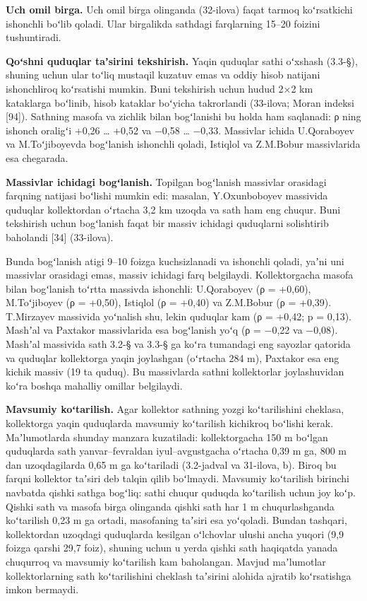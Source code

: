 \documentclass[14pt,a4paper,oneside]{extreport}
\begin{document}
\textbf{Uch omil birga.} Uch omil birga olinganda (32-ilova) faqat
tarmoq koʻrsatkichi ishonchli boʻlib qoladi. Ular birgalikda sathdagi
farqlarning 15--20 foizini tushuntiradi.

\textbf{Qoʻshni quduqlar taʼsirini tekshirish.} Yaqin quduqlar sathi
oʻxshash (3.3-§), shuning uchun ular toʻliq mustaqil kuzatuv emas va
oddiy hisob natijani ishonchliroq koʻrsatishi mumkin. Buni tekshirish
uchun hudud 2×2 km kataklarga boʻlinib, hisob kataklar boʻyicha
takrorlandi (33-ilova; Moran indeksi {[}94{]}). Sathning masofa va
zichlik bilan bogʻlanishi bu holda ham saqlanadi: ρ ning ishonch
oraligʻi +0,26 \ldots{} +0,52 va −0,58 \ldots{} −0,33. Massivlar ichida
U.Qoraboyev va M.Toʻjiboyevda bogʻlanish ishonchli qoladi, Istiqlol va
Z.M.Bobur massivlarida esa chegarada.

\textbf{Massivlar ichidagi bogʻlanish.} Topilgan bogʻlanish massivlar
orasidagi farqning natijasi boʻlishi mumkin edi: masalan, Y.Oxunboboyev
massivida quduqlar kollektordan oʻrtacha 3,2 km uzoqda va sath ham eng
chuqur. Buni tekshirish uchun bogʻlanish faqat bir massiv ichidagi
quduqlarni solishtirib baholandi {[}34{]} (33-ilova).

Bunda bogʻlanish atigi 9--10 foizga kuchsizlanadi va ishonchli qoladi,
yaʼni uni massivlar orasidagi emas, massiv ichidagi farq belgilaydi.
Kollektorgacha masofa bilan bogʻlanish toʻrtta massivda ishonchli:
U.Qoraboyev (ρ = +0,60), M.Toʻjiboyev (ρ = +0,50), Istiqlol (ρ = +0,40)
va Z.M.Bobur (ρ = +0,39). T.Mirzayev massivida yoʻnalish shu, lekin
quduqlar kam (ρ = +0,42; p = 0,13). Mashʼal va Paxtakor massivlarida esa
bogʻlanish yoʻq (ρ = −0,22 va −0,08). Mashʼal massivida sath 3.2-§ va
3.3-§ ga koʻra tumandagi eng sayozlar qatorida va quduqlar kollektorga
yaqin joylashgan (oʻrtacha 284 m), Paxtakor esa eng kichik massiv (19 ta
quduq). Bu massivlarda sathni kollektorlar joylashuvidan koʻra boshqa
mahalliy omillar belgilaydi.

\textbf{Mavsumiy koʻtarilish.} Agar kollektor sathning yozgi
koʻtarilishini cheklasa, kollektorga yaqin quduqlarda mavsumiy
koʻtarilish kichikroq boʻlishi kerak. Maʼlumotlarda shunday manzara
kuzatiladi: kollektorgacha 150 m boʻlgan quduqlarda sath
yanvar--fevraldan iyul--avgustgacha oʻrtacha 0,39 m ga, 800 m dan
uzoqdagilarda 0,65 m ga koʻtariladi (3.2-jadval va 31-ilova, b). Biroq
bu farqni kollektor taʼsiri deb talqin qilib boʻlmaydi. Mavsumiy
koʻtarilish birinchi navbatda qishki sathga bogʻliq: sathi chuqur
quduqda koʻtarilish uchun joy koʻp. Qishki sath va masofa birga
olinganda qishki sath har 1 m chuqurlashganda koʻtarilish 0,23 m ga
ortadi, masofaning taʼsiri esa yoʻqoladi. Bundan tashqari, kollektordan
uzoqdagi quduqlarda kesilgan oʻlchovlar ulushi ancha yuqori (9,9 foizga
qarshi 29,7 foiz), shuning uchun u yerda qishki sath haqiqatda yanada
chuqurroq va mavsumiy koʻtarilish kam baholangan. Mavjud maʼlumotlar
kollektorlarning sath koʻtarilishini cheklash taʼsirini alohida ajratib
koʻrsatishga imkon bermaydi.
\end{document}
